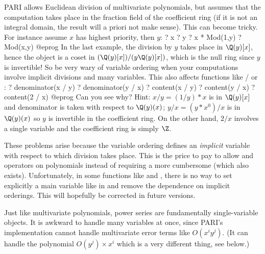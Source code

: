  PARI allows Euclidean division of multivariate
polynomials, but assumes that the computation takes place in the fraction
field of the coefficient ring (if it is not an integral domain, the result
will a priori not make sense). This can become tricky. For instance
assume $x$ has highest priority, then $y$:
\bprog
? x %
? y %
? x * Mod(1,y)
? Mod(x,y)
@eprog
\noindent In the last example, the division by $y$ takes place in
$\Q(y)[x]$,
hence the  object is a coset in $(\Q(y)[x]) / (y\Q(y)[x])$, which
is the null ring since $y$ is invertible! So be very wary of variable
ordering when your computations involve implicit divisions and many
variables. This also affects functions like /
or :
\bprog
? denominator(x / y)
? denominator(y / x)
? content(x / y)
? content(y / x)
? content(2 / x)
@eprog
\noindent Can you see why? Hint: $x/y = (1/y) * x$ is in $\Q(y)[x]$ and
denominator is taken with respect to $\Q(y)(x)$; $y/x = (y*x^0) / x$ is in
$\Q(y)(x)$ so $y$ is invertible in the coefficient ring. On the other hand,
$2/x$ involves a single variable and the coefficient ring is simply $\Z$.

These problems arise because the variable ordering defines an \emph{implicit}
variable with respect to which division takes place. This is
the price to pay to allow \kbd{\%} and \kbd{/} operators on polynomials
instead of requiring a more cumbersome 
(which also exists). Unfortunately, in some functions like  and
, there is no way to set explicitly a main variable like in
 and remove the dependence on implicit orderings. This will
hopefully be corrected in future versions.

Just like multivariate polynomials, power series are fundamentally
single-variable objects. It is awkward to handle many variables at once,
since PARI's implementation cannot handle multivariate error terms like
$O(x^i y^j)$. (It can handle the polynomial $O(y^j) \times x^i$ which is
a very different thing, see below.)

